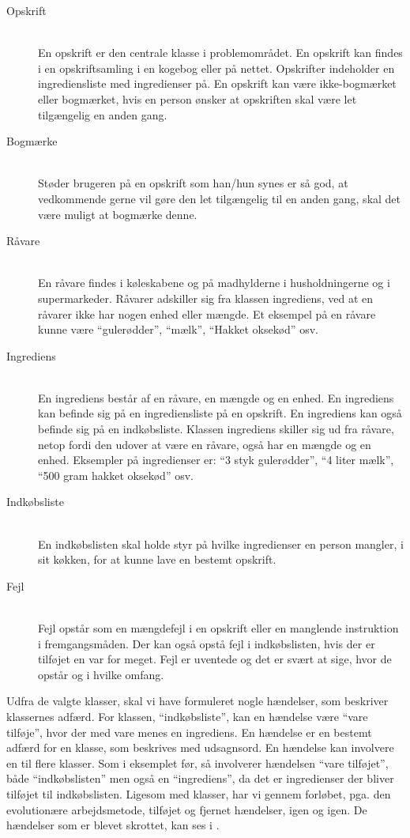 \begin{description}
\item[Opskrift] \hfill \\
En opskrift er den centrale klasse i problemområdet. En opskrift kan findes i en opskriftsamling i en kogebog eller på nettet. Opskrifter indeholder en ingrediensliste med ingredienser på. En opskrift kan være ikke-bogmærket eller bogmærket, hvis en person ønsker at opskriften skal være let tilgængelig en anden gang.

\item[Bogmærke] \hfill \\
Støder brugeren på en opskrift som han/hun synes er så god, at vedkommende gerne vil gøre den let tilgængelig til en anden gang, skal det være muligt at bogmærke denne. 

\item[Råvare] \hfill \\
En råvare findes i køleskabene og på madhylderne i husholdningerne og i supermarkeder. Råvarer adskiller sig fra klassen ingrediens, ved at en råvarer ikke har nogen enhed eller mængde. Et eksempel på en råvare kunne være ``gulerødder'', ``mælk'', ``Hakket oksekød'' osv. 

\item[Ingrediens] \hfill \\ 
En ingrediens består af en råvare, en mængde og en enhed. En ingrediens kan befinde sig på en ingrediensliste på en opskrift. En ingrediens kan også befinde sig på en indkøbsliste. Klassen ingrediens skiller sig ud fra råvare, netop fordi den udover at være en råvare, også har en mængde og en enhed. Eksempler på ingredienser er: ``3 styk gulerødder'', ``4 liter mælk'', ``500 gram hakket oksekød'' osv.

\item[Indkøbsliste] \hfill \\
En indkøbslisten skal holde styr på hvilke ingredienser en person mangler, i sit køkken, for at kunne lave en bestemt opskrift. 

\item[Fejl] \hfill \\
Fejl opstår som \fx en mængdefejl i en opskrift eller en manglende instruktion i fremgangsmåden. Der kan også opstå fejl i indkøbslisten, hvis der er tilføjet en var for meget. Fejl er uventede og det er svært at sige, hvor de opstår og i hvilke omfang.

\end{description}

Udfra de valgte klasser, skal vi have formuleret nogle hændelser, som beskriver klassernes adfærd. For klassen, ``indkøbsliste'', kan en hændelse \fx være ``vare tilføje'', hvor der med vare menes en ingrediens. En hændelse er en bestemt adfærd for en klasse, som beskrives med udsagnsord. En hændelse kan involvere en til flere klasser. Som i eksemplet før, så involverer hændelsen ``vare tilføjet'', både ``indkøbslisten'' men også en ``ingrediens'', da det er ingredienser der bliver tilføjet til indkøbslisten. Ligesom med klasser, har vi gennem forløbet, pga. den evolutionære arbejdsmetode, tilføjet og fjernet hændelser, igen og igen. De hændelser som er blevet skrottet, kan ses i .    

